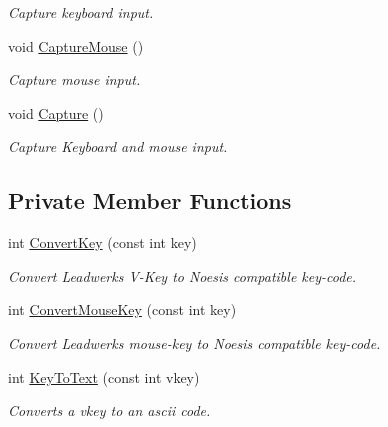 \begin{DoxyCompactItemize}
\begin{DoxyCompactList}\small\item\em Capture keyboard input. \end{DoxyCompactList}\item 
\hypertarget{class_u_i_system_a9139946c67db84d93b4a23a42a51eea1}{void \hyperlink{class_u_i_system_a9139946c67db84d93b4a23a42a51eea1}{Capture\-Mouse} ()}\label{class_u_i_system_a9139946c67db84d93b4a23a42a51eea1}

\begin{DoxyCompactList}\small\item\em Capture mouse input. \end{DoxyCompactList}\item 
\hypertarget{class_u_i_system_a29ac5727af1a979e24f4e8a92ff7a5a3}{void \hyperlink{class_u_i_system_a29ac5727af1a979e24f4e8a92ff7a5a3}{Capture} ()}\label{class_u_i_system_a29ac5727af1a979e24f4e8a92ff7a5a3}

\begin{DoxyCompactList}\small\item\em Capture Keyboard and mouse input. \end{DoxyCompactList}\end{DoxyCompactItemize}
\subsection*{Private Member Functions}
\begin{DoxyCompactItemize}
\item 
int \hyperlink{class_u_i_system_a609dfe50f7414f19e8fc6552807eb4e8}{Convert\-Key} (const int key)
\begin{DoxyCompactList}\small\item\em Convert Leadwerks V-\/\-Key to Noesis compatible key-\/code. \end{DoxyCompactList}\item 
int \hyperlink{class_u_i_system_aa6023e6a0d3b6ce665ae4eabb9ef34f7}{Convert\-Mouse\-Key} (const int key)
\begin{DoxyCompactList}\small\item\em Convert Leadwerks mouse-\/key to Noesis compatible key-\/code. \end{DoxyCompactList}\item 
int \hyperlink{class_u_i_system_ab10ce968219079f159b53a035e115cee}{Key\-To\-Text} (const int vkey)
\begin{DoxyCompactList}\small\item\em Converts a vkey to an ascii code. \end{DoxyCompactList}\end{DoxyCompactItemize}
